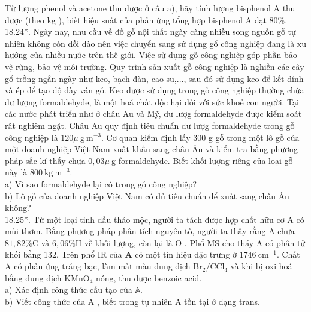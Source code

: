 \documentclass[10pt]{article}
\begin{document}
Từ lượng phenol và acetone thu được ở câu a), hãy tính lượng bisphenol A thu được (theo kg ), biết hiệu suất của phản ứng tổng hợp bisphenol A đạt $80 \%$.\\
18.24*. Ngày nay, nhu cầu về đồ gỗ nội thất ngày càng nhiều song nguồn gỗ tự nhiên không còn dồi dào nên việc chuyển sang sứ dụng gổ công nghiệp đang là xu hướng của nhiều nước trên thế giới. Việc sử dụng gỗ công nghiệp góp phần bảo vệ rừng, bảo vệ môi trường. Quy trình sản xuất gỗ công nghiệp là nghiền các cây gổ trồng ngắn ngày như keo, bạch đàn, cao su,..., sau đó sử dụng keo để kết dính và ép để tạo độ dày ván gỗ. Keo được sử dụng trong gố công nghiệp thường chứa dư lượng formaldehyde, là một hoá chất độc hại đối với sức khoẻ con người. Tại các nước phát triển như ở châu Au và Mỹ, dư lượg formaldehyde được kiểm soát rât nghiêm ngặt. Châu Au quy định tiêu chuẩn dư lượg formaldehyde trong gỗ công nghiệp là $120 \mu \mathrm{~g} \mathrm{~m}^{-3}$. Cơ quan kiểm định lấy 300 g gỗ trong một lô gỗ của một doanh nghiệp Việt Nam xuất khầu sang châu Âu và kiểm tra bằng phương pháp sắc kí thấy chưa $0,03 \mu \mathrm{~g}$ formaldehyde. Biết khối lượng riêng của loại gỗ này là $800 \mathrm{~kg} \mathrm{~m}^{-3}$.\\
a) Vì sao formaldehyde lại có trong gỗ công nghiệp?\\
b) Lô gỗ của doanh nghiệp Việt Nam có đủ tiêu chuẩn để xuất sang châu Âu không?\\
18.25*. Từ một loại tinh dầu thảo mộc, người ta tách được hợp chất hữu cơ A có mùi thơm. Bằng phương pháp phân tích nguyên tố, người ta thấy rằng A chưa $81,82 \% \mathrm{C}$ và $6,06 \% \mathrm{H}$ về khối lượng, còn lại là O . Phổ MS cho tháy A có phân tử khối bằng 132. Trên phổ IR của $\mathbf{A}$ có một tín hiệu đặc trưng ở $1746 \mathrm{~cm}^{-1}$. Chất A có phản ứng tráng bạc, làm mất màu dung dịch $\mathrm{Br}_{2} / \mathrm{CCl}_{4}$ và khi bị oxi hoá bằng dung dịch $\mathrm{KMnO}_{4}$ nóng, thu được benzoic acid.\\
a) Xác định công thức cấu tạo của $\mathbb{A}$.\\
b) Viết công thức của A , biết trong tự nhiên A tồn tại ở dạng trans.
\end{document}
